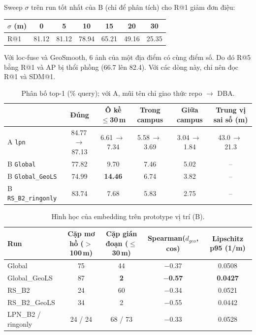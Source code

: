 \documentclass[11pt,a4paper]{article}
\newcommand{\run}[1]{\texttt{#1}}
\begin{document}
Sweep $\sigma$ trên run tốt nhất của B (chỉ để phân tích) cho R@1 giảm đơn điệu:
\begin{center}\small
\begin{tabular}{@{}lcccccc@{}}\toprule
$\sigma$ (m) & 0 & 5 & 10 & 15 & 20 & 30\\\midrule
R@1 & 81.12 & 81.12 & 78.94 & 65.21 & 49.16 & 25.35\\\bottomrule
\end{tabular}
\end{center}
Với loc-fuse và GeoSmooth, 6 ảnh của một địa điểm có cùng điểm số. Do đó R@5 bằng R@1 và AP bị thổi phồng (66.7 lên 82.4). Với các dòng này, chỉ nên đọc R@1 và SDM@1.

\begin{table}[h]\centering\small
\caption{Phân bố top-1 (\% query); với A, mũi tên chỉ giao thức repo $\to$ DBA.}\label{tab:err}
\begin{tabular}{@{}lccccc@{}}\toprule
& Đúng & Ô kề $\le$30\,m & Trong campus & Giữa campus & Trung vị sai số (m)\\\midrule
A \run{lpn} & 84.77\,$\to$\,87.13 & 6.61\,$\to$\,7.34 & 5.58\,$\to$\,3.69 & 3.04\,$\to$\,1.84 & 43.0\,$\to$\,21.3\\
B \run{Global} & 77.82 & 9.70 & 7.46 & 5.02 & --\\
B \run{Global\_GeoLS} & 74.99 & \textbf{14.46} & 6.74 & 3.82 & --\\
B \run{RS\_B2\_ringonly} & 83.74 & 7.68 & 5.83 & 2.75 & --\\\bottomrule
\end{tabular}
\end{table}

\begin{table}[h]\centering\small
\caption{Hình học của embedding trên prototype vị trí (B).}\label{tab:geo}
\begin{tabular}{@{}lcccc@{}}\toprule
Run & Cặp mơ hồ ($>$100\,m) & Cặp gián đoạn ($\le$30\,m) & Spearman($d_{geo}$, cos) & Lipschitz p95 (1/m)\\\midrule
Global & 75 & 44 & $-$0.37 & 0.0508\\
Global\_GeoLS & 87 & \textbf{2} & \textbf{$-$0.57} & \textbf{0.0427}\\
RS\_B2 & 24 & 60 & $-$0.34 & 0.0521\\
RS\_B2\_GeoLS & 34 & 2 & $-$0.55 & 0.0442\\
LPN\_B2 / ringonly & 24 / 24 & 68 / 73 & $-$0.33 & 0.0528\\\bottomrule
\end{tabular}
\end{table}
\end{document}
